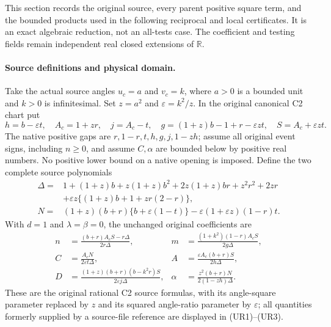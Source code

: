 \label{pc3daa35e9a9b:sec:ui-full-parent-reduction}

This section records the original source, every parent positive square term, and the
bounded products used in the following reciprocal and local certificates.
It is an exact algebraic reduction, not an all-tests case. The
coefficient and testing fields remain independent real closed extensions
of $\mathbb R$.

\paragraph{Source definitions and physical domain.}
Take the actual source angles $u_c=a$ and $v_c=k$, where $a>0$ is a
bounded unit and $k>0$ is infinitesimal. Set $z=a^2$ and
$\varepsilon=k^2/z$. In the original canonical C2 chart put
\[
 h=b-\varepsilon t,\quad A_c=1+zr,\quad j=A_c-t,\quad
 g=(1+z)b-1+r-\varepsilon zt,\quad S=A_c+\varepsilon zt.
 \tag{UR1}\label{pc3daa35e9a9b:eq:ui-source-gaps}
\]
The native positive gaps are $r,1-r,t,h,g,j,1-zh$; assume all original
event signs, including $n\ge0$, and assume $C,\alpha$ are bounded below
by positive real numbers. No positive lower bound on a native opening
is imposed. Define the two complete source polynomials
\begin{align*}
 \Delta={}&1+(1+z)b+z(1+z)b^2+2z(1+z)br+z^2r^2+2zr\\
 &+\varepsilon z\{(1+z)b+1+zr(2-r)\},\\
 N={}&(1+z)(b+r)\{b+\varepsilon(1-t)\}
          -\varepsilon(1+\varepsilon z)(1-r)t.
 \tag{UR2}\label{pc3daa35e9a9b:eq:ui-source-polynomials}
\end{align*}
With $d=1$ and $\lambda=\beta=0$, the unchanged original coefficients
are
\[
 \begin{aligned}
 n&=\frac{(b+r)A_cS-r\Delta}{2r\Delta},&
 m&=\frac{(1+k^2)(1-r)A_cS}{2g\Delta},\\
 C&=\frac{A_cN}{2\varepsilon t\Delta},&
 A&=\frac{\varepsilon A_c(b+r)S}{2h\Delta},\\
 D&=\frac{(1+z)(b+r)(b-k^2r)S}{2\varepsilon j\Delta},&
 \alpha&=\frac{z^2(b+r)N}{2(1-zh)\Delta}.
 \end{aligned}                                                   \tag{UR3}
 \label{pc3daa35e9a9b:eq:ui-original-source}
\]
These are the original rational C2 source formulas, with its angle-square
parameter replaced by $z$ and its squared angle-ratio parameter by
$\varepsilon$; all quantities formerly supplied by a source-file
reference are displayed in (UR1)--(UR3).

